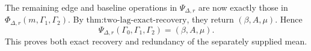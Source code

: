 The remaining edge and baseline operations in \(\Psi_{\Delta,r}\) are now exactly those in \(\Phi_{\Delta,r}(m,\Gamma_1,\Gamma_2)\).  By \(\text{thm:two-lag-exact-recovery}\), they return \((\beta,A,\mu)\).  Hence
\[
 \Psi_{\Delta,r}(\Gamma_0,\Gamma_1,\Gamma_2)=(\beta,A,\mu).
\]
This proves both exact recovery and redundancy of the separately supplied mean.